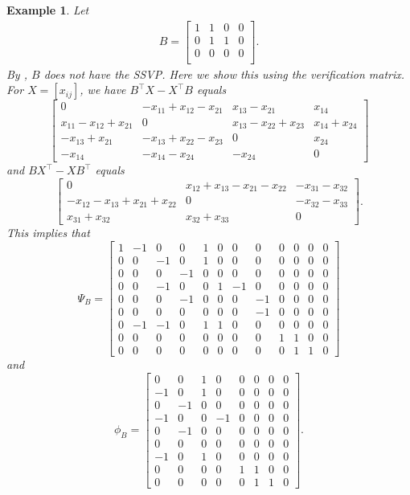 \documentclass[preprint,12pt]{elsarticle}
\newcommand{\trans  }{^\top}
\newtheorem{Example}[theorem]{Example}
\begin{document}
\begin{Example}
\rm 
Let
\begin{align*}
    B = \begin{bmatrix}
        1 & 1 & 0 & 0\\
        0 & 1 & 1 & 0\\
        0 & 0 & 0 & 0\\
    \end{bmatrix}.
\end{align*}
By , $B$ does not have the SSVP.  Here we show this using the verification matrix. For $X=[x_{ij}]$, we have $B\trans X -X\trans B$ equals 
{\small \[
\left[\begin{array}{cccc}
0 & -x_{11} + x_{12} - x_{21} & x_{13} - x_{21} & x_{14} \\
x_{11} - x_{12} + x_{21} & 0 & x_{13} - x_{22} + x_{23} & x_{14} + x_{24} \\
-x_{13} + x_{21} & -x_{13} + x_{22} - x_{23} & 0 & x_{24} \\
-x_{14} & -x_{14} - x_{24} & -x_{24} & 0
\end{array}\right]
\]}
and $BX\trans-XB\trans$ equals 
{\small \[ 
\left[\begin{array}{ccc}
0 & x_{12} + x_{13} - x_{21} - x_{22} & -x_{31} - x_{32} \\
-x_{12} - x_{13} + x_{21} + x_{22} & 0 & -x_{32} - x_{33} \\
x_{31} + x_{32} & x_{32} + x_{33} & 0
\end{array}\right].
\] }
This implies that 
{\small
\[ 
\Psi_B= \left[\begin{array}{rrrrrrrrrrrr}
1 & -1 & 0 & 0 & 1 & 0 & 0 & 0 & 0 & 0 & 0 & 0 \\
0 & 0 & -1 & 0 & 1 & 0 & 0 & 0 & 0 & 0 & 0 & 0 \\
0 & 0 & 0 & -1 & 0 & 0 & 0 & 0 & 0 & 0 & 0 & 0 \\
0 & 0 & -1 & 0 & 0 & 1 & -1 & 0 & 0 & 0 & 0 & 0 \\
0 & 0 & 0 & -1 & 0 & 0 & 0 & -1 & 0 & 0 & 0 & 0 \\
0 & 0 & 0 & 0 & 0 & 0 & 0 & -1 & 0 & 0 & 0 & 0 \\
0 & -1 & -1 & 0 & 1 & 1 & 0 & 0 & 0 & 0 & 0 & 0 \\
0 & 0 & 0 & 0 & 0 & 0 & 0 & 0 & 1 & 1 & 0 & 0 \\
0 & 0 & 0 & 0 & 0 & 0 & 0 & 0 & 0 & 1 & 1 & 0
\end{array}\right] 
\]}
and 
{\small \[ 
\phi_B=\left[\begin{array}{rrrrrrrr}
0 & 0 & 1 & 0 & 0 & 0 & 0 & 0 \\
-1 & 0 & 1 & 0 & 0 & 0 & 0 & 0 \\
0 & -1 & 0 & 0 & 0 & 0 & 0 & 0 \\
-1 & 0 & 0 & -1 & 0 & 0 & 0 & 0 \\
0 & -1 & 0 & 0 & 0 & 0 & 0 & 0 \\
0 & 0 & 0 & 0 & 0 & 0 & 0 & 0 \\
-1 & 0 & 1 & 0 & 0 & 0 & 0 & 0 \\
0 & 0 & 0 & 0 & 1 & 1 & 0 & 0 \\
0 & 0 & 0 & 0 & 0 & 1 & 1 & 0
\end{array}\right].
\]
}


\end{Example}
\end{document}
